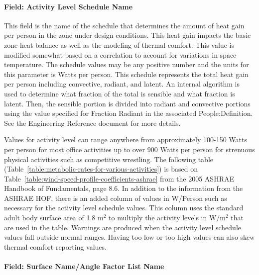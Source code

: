 \paragraph{Field: Activity Level Schedule Name}\label{field-activity-level-schedule-name-people-instance}

This field is the name of the schedule that determines the amount of heat gain per person in the zone under design conditions. This heat gain impacts the basic zone heat balance as well as the modeling of thermal comfort. This value is modified somewhat based on a correlation to account for variations in space temperature. The schedule values may be any positive number and the units for this parameter is Watts per person. This schedule represents the total heat gain per person including convective, radiant, and latent. An internal algorithm is used to determine what fraction of the total is sensible and what fraction is latent. Then, the sensible portion is divided into radiant and convective portions using the value specified for Fraction Radiant in the associated People:Definition. See the Engineering Reference document for more details.

Values for activity level can range anywhere from approximately 100-150 Watts per person for most office activities up to over 900 Watts per person for strenuous physical activities such as competitive wrestling. The following table (Table~\ref{table:metabolic-rates-for-various-activities}) is based on Table~\ref{table:wind-speed-profile-coefficients-ashrae} from the 2005 ASHRAE Handbook of Fundamentals, page 8.6. In addition to the information from the ASHRAE HOF, there is an added column of values in W/Person such as necessary for the activity level schedule values. This column uses the standard adult body surface area of 1.8 m\(^{2}\) to multiply the activity levels in W/m\(^{2}\) that are used in the table. Warnings are produced when the activity level schedule values fall outside normal ranges. Having too low or too high values can also skew thermal comfort reporting values.


\paragraph{Field: Surface Name/Angle Factor List Name}\label{field-surface-nameangle-factor-list-name-people-instance}

